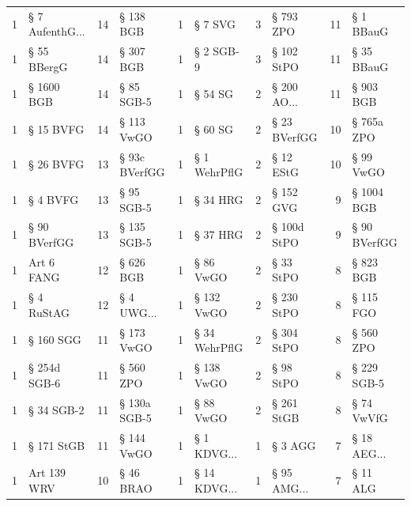 \begin{tabular}{rlrlrlrlrl}
         1 &  § 7 AufenthG... &         14 &     § 138 BGB &           1 &        § 7 SVG &          3 &     § 793 ZPO &         11 &     § 1 BBauG \\
         1 &        § 55 BBergG &         14 &     § 307 BGB &           1 &      § 2 SGB-9 &          3 &    § 102 StPO &         11 &    § 35 BBauG \\
         1 &         § 1600 BGB &         14 &    § 85 SGB-5 &           1 &        § 54 SG &          2 & § 200 AO... &         11 &     § 903 BGB \\
         1 &          § 15 BVFG &         14 &    § 113 VwGO &           1 &        § 60 SG &          2 &  § 23 BVerfGG &         10 &    § 765a ZPO \\
         1 &          § 26 BVFG &         13 & § 93c BVerfGG &           1 &   § 1 WehrPflG &          2 &     § 12 EStG &         10 &     § 99 VwGO \\
         1 &           § 4 BVFG &         13 &    § 95 SGB-5 &           1 &       § 34 HRG &          2 &     § 152 GVG &          9 &    § 1004 BGB \\
         1 &       § 90 BVerfGG &         13 &   § 135 SGB-5 &           1 &       § 37 HRG &          2 &   § 100d StPO &          9 &  § 90 BVerfGG \\
         1 &         Art 6 FANG &         12 &     § 626 BGB &           1 &      § 86 VwGO &          2 &     § 33 StPO &          8 &     § 823 BGB \\
         1 &         § 4 RuStAG &         12 &  § 4 UWG... &           1 &     § 132 VwGO &          2 &    § 230 StPO &          8 &     § 115 FGO \\
         1 &          § 160 SGG &         11 &    § 173 VwGO &           1 &  § 34 WehrPflG &          2 &    § 304 StPO &          8 &     § 560 ZPO \\
         1 &       § 254d SGB-6 &         11 &     § 560 ZPO &           1 &     § 138 VwGO &          2 &     § 98 StPO &          8 &   § 229 SGB-5 \\
         1 &         § 34 SGB-2 &         11 &  § 130a SGB-5 &           1 &      § 88 VwGO &          2 &    § 261 StGB &          8 &    § 74 VwVfG \\
         1 &         § 171 StGB &         11 &    § 144 VwGO &           1 &  § 1 KDVG... &          1 &       § 3 AGG &          7 & § 18 AEG... \\
         1 &        Art 139 WRV &         10 &     § 46 BRAO &           1 & § 14 KDVG... &          1 & § 95 AMG... &          7 &      § 11 ALG \\
\bottomrule
\end{tabular}

